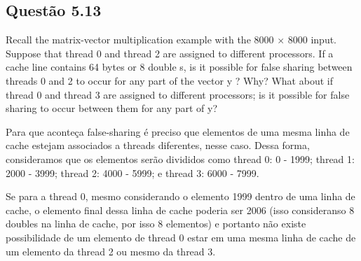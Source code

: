 
\subsection{Questão 5.13}

Recall the matrix-vector multiplication example with the 8000 $\times$ 8000 input. Suppose that thread 0 and thread 2 are assigned to different processors. If a cache line contains 64 bytes or 8 double s, is it possible for false sharing between threads 0 and 2 to occur for any part of the vector y ? Why? What about if thread 0 and thread 3 are assigned to different processors; is it possible for false sharing to occur between them for any part of y?

Para que aconteça false-sharing é preciso que elementos de uma mesma linha de cache estejam associados a threads diferentes, nesse caso. Dessa forma, consideramos que os elementos serão divididos como thread 0: 0 - 1999; thread 1: 2000 - 3999; thread 2: 4000 - 5999; e thread 3: 6000 - 7999.

Se para a thread 0, mesmo considerando o elemento 1999 dentro de uma linha de cache, o elemento final dessa linha de cache poderia ser 2006 (isso consideranso 8 doubles na linha de cache, por isso 8 elementos) e portanto não existe possibilidade de um elemento de thread 0 estar em uma mesma linha de cache de um elemento da thread 2 ou mesmo da thread 3.

